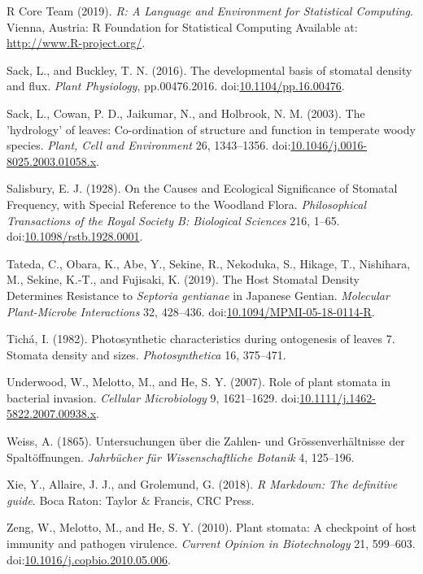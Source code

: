 \documentclass[utf8]{frontiersSCNS}
\begin{document}
\leavevmode\hypertarget{ref-r_core_team_r:_2019}{}%
R Core Team (2019). \emph{R: A Language and Environment for Statistical
Computing}. Vienna, Austria: R Foundation for Statistical Computing
Available at: \url{http://www.R-project.org/}.

\leavevmode\hypertarget{ref-sack_developmental_2016}{}%
Sack, L., and Buckley, T. N. (2016). The developmental basis of stomatal
density and flux. \emph{Plant Physiology}, pp.00476.2016.
doi:\href{https://doi.org/10.1104/pp.16.00476}{10.1104/pp.16.00476}.

\leavevmode\hypertarget{ref-sack_hydrology_2003}{}%
Sack, L., Cowan, P. D., Jaikumar, N., and Holbrook, N. M. (2003). The
'hydrology' of leaves: Co-ordination of structure and function in
temperate woody species. \emph{Plant, Cell and Environment} 26,
1343--1356.
doi:\href{https://doi.org/10.1046/j.0016-8025.2003.01058.x}{10.1046/j.0016-8025.2003.01058.x}.

\leavevmode\hypertarget{ref-salisbury_causes_1928}{}%
Salisbury, E. J. (1928). On the Causes and Ecological Significance of
Stomatal Frequency, with Special Reference to the Woodland Flora.
\emph{Philosophical Transactions of the Royal Society B: Biological
Sciences} 216, 1--65.
doi:\href{https://doi.org/10.1098/rstb.1928.0001}{10.1098/rstb.1928.0001}.

\leavevmode\hypertarget{ref-tateda_host_2019}{}%
Tateda, C., Obara, K., Abe, Y., Sekine, R., Nekoduka, S., Hikage, T.,
Nishihara, M., Sekine, K.-T., and Fujisaki, K. (2019). The Host Stomatal
Density Determines Resistance to \emph{Septoria gentianae} in Japanese
Gentian. \emph{Molecular Plant-Microbe Interactions} 32, 428--436.
doi:\href{https://doi.org/10.1094/MPMI-05-18-0114-R}{10.1094/MPMI-05-18-0114-R}.

\leavevmode\hypertarget{ref-ticha_photosynthetic_1982}{}%
Tichá, I. (1982). Photosynthetic characteristics during ontogenesis of
leaves 7. Stomata density and sizes. \emph{Photosynthetica} 16,
375--471.

\leavevmode\hypertarget{ref-underwood_role_2007}{}%
Underwood, W., Melotto, M., and He, S. Y. (2007). Role of plant stomata
in bacterial invasion. \emph{Cellular Microbiology} 9, 1621--1629.
doi:\href{https://doi.org/10.1111/j.1462-5822.2007.00938.x}{10.1111/j.1462-5822.2007.00938.x}.

\leavevmode\hypertarget{ref-weiss_untersuchungen_1865}{}%
Weiss, A. (1865). Untersuchungen über die Zahlen- und
Grössenverhältnisse der Spaltöffnungen. \emph{Jahrbücher für
Wissenschaftliche Botanik} 4, 125--196.

\leavevmode\hypertarget{ref-xie_r_2018}{}%
Xie, Y., Allaire, J. J., and Grolemund, G. (2018). \emph{R Markdown: The
definitive guide}. Boca Raton: Taylor \& Francis, CRC Press.

\leavevmode\hypertarget{ref-zeng_plant_2010}{}%
Zeng, W., Melotto, M., and He, S. Y. (2010). Plant stomata: A checkpoint
of host immunity and pathogen virulence. \emph{Current Opinion in
Biotechnology} 21, 599--603.
doi:\href{https://doi.org/10.1016/j.copbio.2010.05.006}{10.1016/j.copbio.2010.05.006}.
\end{document}
